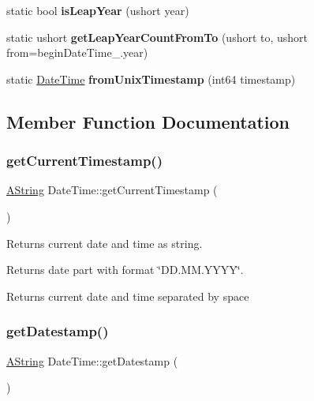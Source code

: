 \begin{DoxyCompactItemize}
\item 
\mbox{\label{class_date_time_afd597cb69bb422b066bac46c96cc5f12}} 
static bool {\bfseries is\+Leap\+Year} (ushort year)
\item 
\mbox{\label{class_date_time_a8401d6a8ad1aec862f2a96bb9eda1870}} 
static ushort {\bfseries get\+Leap\+Year\+Count\+From\+To} (ushort to, ushort from=begin\+Date\+Time\+\_\+.\+year)
\item 
\mbox{\label{class_date_time_afdc41a37a33bc6c5643430494f959c1b}} 
static \mbox{\hyperlink{class_date_time}{Date\+Time}} {\bfseries from\+Unix\+Timestamp} (int64 timestamp)
\end{DoxyCompactItemize}


\subsection{Member Function Documentation}
\mbox{\label{class_date_time_aee3108295b202fc4807984c25778c942}} 
\subsubsection{\texorpdfstring{getCurrentTimestamp()}{getCurrentTimestamp()}}
{\footnotesize\ttfamily \mbox{\hyperlink{class_a_string}{A\+String}} Date\+Time\+::get\+Current\+Timestamp (\begin{DoxyParamCaption}{ }\end{DoxyParamCaption})\hspace{0.3cm}{\ttfamily [static]}}



Returns current date and time as string. 

Returns date part with format \char`\"{}\+D\+D.\+M\+M.\+Y\+Y\+Y\+Y\char`\"{}. \begin{DoxyReturn}{Returns}
current date and time separated by space 
\end{DoxyReturn}
\mbox{\label{class_date_time_ab8bbdb70e38a18cad9269b6f856f5634}} 
\subsubsection{\texorpdfstring{getDatestamp()}{getDatestamp()}}
{\footnotesize\ttfamily \mbox{\hyperlink{class_a_string}{A\+String}} Date\+Time\+::get\+Datestamp (\begin{DoxyParamCaption}{ }\end{DoxyParamCaption})\hspace{0.3cm}{\ttfamily [static]}}



